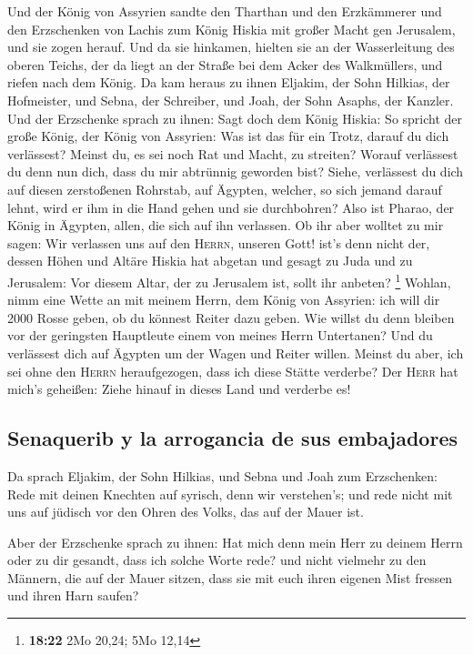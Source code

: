  Und der König von Assyrien sandte den Tharthan und den
Erzkämmerer und den Erzschenken von Lachis zum König Hiskia mit großer
Macht gen Jerusalem, und sie zogen herauf. Und da sie hinkamen, hielten
sie an der Wasserleitung des oberen Teichs, der da liegt an der Straße
bei dem Acker des Walkmüllers,  und riefen nach dem
König. Da kam heraus zu ihnen Eljakim, der Sohn Hilkias, der Hofmeister,
und Sebna, der Schreiber, und Joah, der Sohn Asaphs, der Kanzler.
 Und der Erzschenke sprach zu ihnen: Sagt doch dem König
Hiskia: So spricht der große König, der König von Assyrien: Was ist das
für ein Trotz, darauf du dich verlässest?  Meinst du, es
sei noch Rat und Macht, zu streiten? Worauf verlässest du denn nun dich,
dass du mir abtrünnig geworden bist?  Siehe, verlässest
du dich auf diesen zerstoßenen Rohrstab, auf Ägypten, welcher, so sich
jemand darauf lehnt, wird er ihm in die Hand gehen und sie durchbohren?
Also ist Pharao, der König in Ägypten, allen, die sich auf ihn
verlassen.  Ob ihr aber wolltet zu mir sagen: Wir
verlassen uns auf den \textsc{Herrn}, unseren Gott! ist's denn nicht
der, dessen Höhen und Altäre Hiskia hat abgetan und gesagt zu Juda und
zu Jerusalem: Vor diesem Altar, der zu Jerusalem ist, sollt ihr anbeten?
\footnote{\textbf{18:22} 2Mo 20,24; 5Mo 12,14}  Wohlan,
nimm eine Wette an mit meinem Herrn, dem König von Assyrien: ich will
dir 2000 Rosse geben, ob du könnest Reiter dazu geben. 
Wie willst du denn bleiben vor der geringsten Hauptleute einem von
meines Herrn Untertanen? Und du verlässest dich auf Ägypten um der Wagen
und Reiter willen.  Meinst du aber, ich sei ohne den
\textsc{Herrn} heraufgezogen, dass ich diese Stätte verderbe? Der
\textsc{Herr} hat mich's geheißen: Ziehe hinauf in dieses Land und
verderbe es!

\hypertarget{senaquerib-y-la-arrogancia-de-sus-embajadores}{%
\subsection{Senaquerib y la arrogancia de sus
embajadores}\label{senaquerib-y-la-arrogancia-de-sus-embajadores}}

 Da sprach Eljakim, der Sohn Hilkias, und Sebna und Joah
zum Erzschenken: Rede mit deinen Knechten auf syrisch, denn wir
verstehen's; und rede nicht mit uns auf jüdisch vor den Ohren des Volks,
das auf der Mauer ist.

 Aber der Erzschenke sprach zu ihnen: Hat mich denn mein
Herr zu deinem Herrn oder zu dir gesandt, dass ich solche Worte rede?
und nicht vielmehr zu den Männern, die auf der Mauer sitzen, dass sie
mit euch ihren eigenen Mist fressen und ihren Harn saufen?

